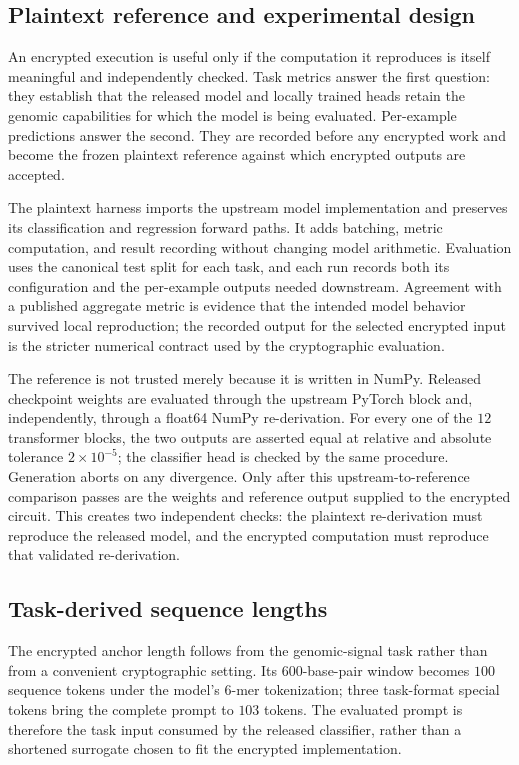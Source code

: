 
\subsection{Plaintext reference and experimental design}
\label{sec:baseline}

An encrypted execution is useful only if the computation it reproduces is itself meaningful and
independently checked. Task metrics answer the first question: they establish that the released
model and locally trained heads retain the genomic capabilities for which the model is being
evaluated. Per-example predictions answer the second. They are recorded before any encrypted work
and become the frozen plaintext reference against which encrypted outputs are accepted.

The plaintext harness imports the upstream model implementation and preserves its classification
and regression forward paths. It adds batching, metric computation, and result recording without
changing model arithmetic. Evaluation uses the canonical test split for each task, and each run
records both its configuration and the per-example outputs needed downstream. Agreement with a
published aggregate metric is evidence that the intended model behavior survived local
reproduction; the recorded output for the selected encrypted input is the stricter numerical
contract used by the cryptographic evaluation.

The reference is not trusted merely because it is written in NumPy. Released checkpoint weights
are evaluated through the upstream PyTorch block and, independently, through a float64 NumPy
re-derivation. For every one of the $12$ transformer blocks, the two outputs are asserted equal at
relative and absolute tolerance $2\times10^{-5}$; the classifier head is checked by the same
procedure. Generation aborts on any divergence. Only after this upstream-to-reference comparison
passes are the weights and reference output supplied to the encrypted circuit. This creates two
independent checks: the plaintext re-derivation must reproduce the released model, and the
encrypted computation must reproduce that validated re-derivation.

\subsection{Task-derived sequence lengths}
The encrypted anchor length follows from the genomic-signal task rather than from a convenient
cryptographic setting. Its $600$-base-pair window becomes $100$ sequence tokens under the model's
$6$-mer tokenization; three task-format special tokens bring the complete prompt to $103$ tokens.
The evaluated prompt is therefore the task input consumed by the released classifier, rather than
a shortened surrogate chosen to fit the encrypted implementation.


